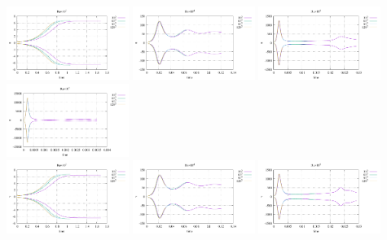 \begin{center}
\includegraphics[width=3.97cm]{python_codes/fieldstone_155/results/stats_u_Ra1e3}
\includegraphics[width=3.97cm]{python_codes/fieldstone_155/results/stats_u_Ra1e4}
\includegraphics[width=3.97cm]{python_codes/fieldstone_155/results/stats_u_Ra1e5}
\includegraphics[width=3.97cm]{python_codes/fieldstone_155/results/stats_u_Ra1e6}\\
\includegraphics[width=3.97cm]{python_codes/fieldstone_155/results/stats_v_Ra1e3}
\includegraphics[width=3.97cm]{python_codes/fieldstone_155/results/stats_v_Ra1e4}
\includegraphics[width=3.97cm]{python_codes/fieldstone_155/results/stats_v_Ra1e5}

\end{center}
